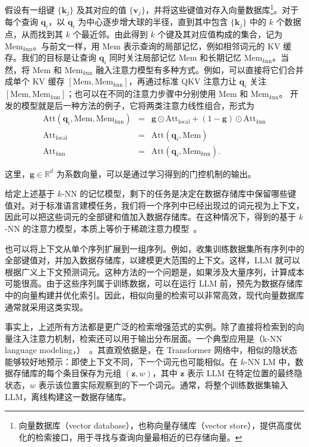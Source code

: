 假设有一组键 $\{\mathbf{k}_j\}$ 及其对应的值 $\{\mathbf{v}_j\}$，并将这些键值对存入向量数据库\footnote{向量数据库（vector database），也称向量存储库（vector store），提供高度优化的检索接口，用于寻找与查询向量最相近的已存储向量。}。对于每个查询 $\mathbf{q}_{i}$，以 $\mathbf{q}_i$ 为中心逐步增大球的半径，直到其中包含 $\{\mathbf{k}_j\}$ 中的 $k$ 个数据点，从而找到其 $k$ 个最近邻。由此得到 $k$ 个键及其对应值构成的集合，记为 $\mathrm{Mem}_{k\mathrm{nn}}$。与前文一样，用 $\mathrm{Mem}$ 表示查询的局部记忆，例如相邻词元的 KV 缓存。我们的目标是让查询 $\mathbf{q}_i$ 同时关注局部记忆 $\mathrm{Mem}$ 和长期记忆 $\mathrm{Mem}_{k\mathrm{nn}}$。当然，将 $\mathrm{Mem}$ 和 $\mathrm{Mem}_{k\mathrm{nn}}$ 融入注意力模型有多种方式。例如，可以直接将它们合并成单个 KV 缓存 $[\mathrm{Mem},\mathrm{Mem}_{k\mathrm{nn}}]$，再通过标准 QKV 注意力让 $\mathbf{q}_i$ 关注 $[\mathrm{Mem},\mathrm{Mem}_{k\mathrm{nn}}]$；也可以在不同的注意力步骤中分别使用 $\mathrm{Mem}$ 和 $\mathrm{Mem}_{k\mathrm{nn}}$。\citet{wu-etal:2021memorizing} 开发的模型就是后一种方法的例子，它将两类注意力线性组合，形式为
\begin{eqnarray}
\mathrm{Att}(\mathbf{q}_i,\mathrm{Mem},\mathrm{Mem}_{k\mathrm{nn}}) & = & \mathbf{g} \odot \mathrm{Att}_{\mathrm{local}} + (1 - \mathbf{g}) \odot \mathrm{Att}_{k\mathrm{nn}} \\
\mathrm{Att}_{\mathrm{local}} & = & \mathrm{Att}(\mathbf{q}_i,\mathrm{Mem}) \\
\mathrm{Att}_{k\mathrm{nn}} & = & \mathrm{Att}(\mathbf{q}_i,\mathrm{Mem}_{k\mathrm{nn}}).
\end{eqnarray}

\noindent 这里，$\mathbf{g} \in \mathbb{R}^{d}$ 为系数向量，可以是通过学习得到的门控机制的输出。

给定上述基于 $k$-NN 的记忆模型，剩下的任务是决定在数据存储库中保留哪些键值对。对于标准语言建模任务，我们将一个序列中已经出现过的词元视为上下文，因此可以把这些词元的全部键和值加入数据存储库。在这种情况下，得到的基于 $k$-NN 的注意力模型，本质上等价于稀疏注意力模型~\cite{gupta-etal:2021memory}。

也可以将上下文从单个序列扩展到一组序列。例如，收集训练数据集所有序列中的全部键值对，并加入数据存储库，以建模更大范围的上下文。这样，LLM 就可以根据广义上下文预测词元。这种方法的一个问题是，如果涉及大量序列，计算成本可能很高。由于这些序列属于训练数据，可以在运行 LLM 前，预先为数据存储库中的向量构建并优化索引。因此，相似向量的检索可以非常高效，现代向量数据库通常就采用这类实现。

事实上，上述所有方法都是更广泛的检索增强范式的实例。除了直接将检索到的向量注入注意力机制，检索还可以用于输出分布层面。一个典型应用是（k-NN language modeling，）~\cite{khandelwal-etal:2020generalization}。其直观依据是，在 Transformer 网络中，相似的隐状态能够较好地预示：即使上下文不同，下一个词元也可能相似。在 $k$-NN LM 中，数据存储库的每个条目保存为元组 $(\mathbf{z},w)$，其中 $\mathbf{z}$ 表示 LLM 在特定位置的最终隐状态，$w$ 表示该位置实际观察到的下一个词元。通常，将整个训练数据集输入 LLM，离线构建这一数据存储库。

